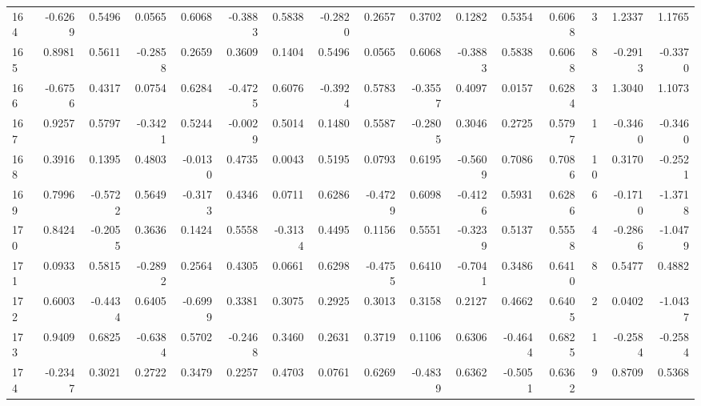 \begin{tabular}{lrrrrrrrrrrrrrrr}
164 &     -0.6269 &  0.5496 &  0.0565 &  0.6068 & -0.3883 &  0.5838 & -0.2820 &  0.2657 &  0.3702 &  0.1282 &   0.5354 &     0.6068 &      3 &                    1.2337 &                     1.1765 \\
165 &      0.8981 &  0.5611 & -0.2858 &  0.2659 &  0.3609 &  0.1404 &  0.5496 &  0.0565 &  0.6068 & -0.3883 &   0.5838 &     0.6068 &      8 &                   -0.2913 &                    -0.3370 \\
166 &     -0.6756 &  0.4317 &  0.0754 &  0.6284 & -0.4725 &  0.6076 & -0.3924 &  0.5783 & -0.3557 &  0.4097 &   0.0157 &     0.6284 &      3 &                    1.3040 &                     1.1073 \\
167 &      0.9257 &  0.5797 & -0.3421 &  0.5244 & -0.0029 &  0.5014 &  0.1480 &  0.5587 & -0.2805 &  0.3046 &   0.2725 &     0.5797 &      1 &                   -0.3460 &                    -0.3460 \\
168 &      0.3916 &  0.1395 &  0.4803 & -0.0130 &  0.4735 &  0.0043 &  0.5195 &  0.0793 &  0.6195 & -0.5609 &   0.7086 &     0.7086 &     10 &                    0.3170 &                    -0.2521 \\
169 &      0.7996 & -0.5722 &  0.5649 & -0.3173 &  0.4346 &  0.0711 &  0.6286 & -0.4729 &  0.6098 & -0.4126 &   0.5931 &     0.6286 &      6 &                   -0.1710 &                    -1.3718 \\
170 &      0.8424 & -0.2055 &  0.3636 &  0.1424 &  0.5558 & -0.3134 &  0.4495 &  0.1156 &  0.5551 & -0.3239 &   0.5137 &     0.5558 &      4 &                   -0.2866 &                    -1.0479 \\
171 &      0.0933 &  0.5815 & -0.2892 &  0.2564 &  0.4305 &  0.0661 &  0.6298 & -0.4755 &  0.6410 & -0.7041 &   0.3486 &     0.6410 &      8 &                    0.5477 &                     0.4882 \\
172 &      0.6003 & -0.4434 &  0.6405 & -0.6999 &  0.3381 &  0.3075 &  0.2925 &  0.3013 &  0.3158 &  0.2127 &   0.4662 &     0.6405 &      2 &                    0.0402 &                    -1.0437 \\
173 &      0.9409 &  0.6825 & -0.6384 &  0.5702 & -0.2468 &  0.3460 &  0.2631 &  0.3719 &  0.1106 &  0.6306 &  -0.4644 &     0.6825 &      1 &                   -0.2584 &                    -0.2584 \\
174 &     -0.2347 &  0.3021 &  0.2722 &  0.3479 &  0.2257 &  0.4703 &  0.0761 &  0.6269 & -0.4839 &  0.6362 &  -0.5051 &     0.6362 &      9 &                    0.8709 &                     0.5368 \\

\end{tabular}
